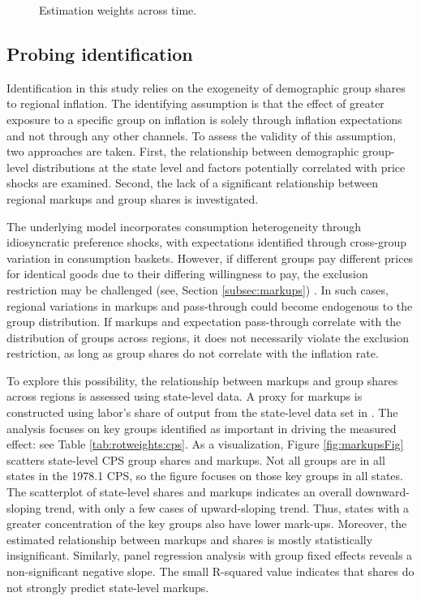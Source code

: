 \documentclass[12pt]{article}
\begin{document}
\begin{figure}
\centering
\caption{Estimation weights across time.}\label{fig:rotweights:time}

\end{figure}



\subsection{Probing identification}

Identification in this study relies on the exogeneity of demographic group shares to regional inflation. The identifying assumption is that the effect of greater exposure to a specific group on inflation is solely through inflation expectations and not through any other channels. To assess the validity of this assumption, two approaches are taken. First, the relationship between demographic group-level distributions at the state level and factors potentially correlated with price shocks are examined. Second, the lack of a significant relationship between regional markups and group shares is investigated. 

The underlying model incorporates consumption heterogeneity through idiosyncratic preference shocks, with expectations identified through cross-group variation in consumption baskets. However, if different groups pay different prices for identical goods due to their differing willingness to pay, the exclusion restriction may be challenged (see, Section \ref{subsec:markups}) . In such cases, regional variations in markups and pass-through could become endogenous to the group distribution. If markups and expectation pass-through correlate with the distribution of groups across regions, it does not necessarily violate the exclusion restriction, as long as group shares do not correlate with the inflation rate. 

To explore this possibility, the relationship between markups and group shares across regions is assessed using state-level data. A proxy for markups is constructed using labor's share of output from the state-level data set in \cite{NakamuraSteinsson:AER2014}. The analysis focuses on key groups identified as important in driving the measured effect: see Table \ref{tab:rotweights:cps}.  As a visualization, Figure \ref{fig:markupsFig} scatters state-level CPS group shares and markups.  Not all groups are in all states in the 1978.1 CPS, so the figure focuses on those key groups in all states.  The scatterplot of state-level shares and markups indicates an overall downward-sloping trend, with only a few cases of upward-sloping trend.  Thus, states with a greater concentration of the key groups also have lower mark-ups. Moreover, the estimated relationship between markups and shares is mostly statistically insignificant. Similarly, panel regression analysis with group fixed effects reveals a non-significant negative slope. The small R-squared value indicates that shares do not strongly predict state-level markups. 
\end{document}
